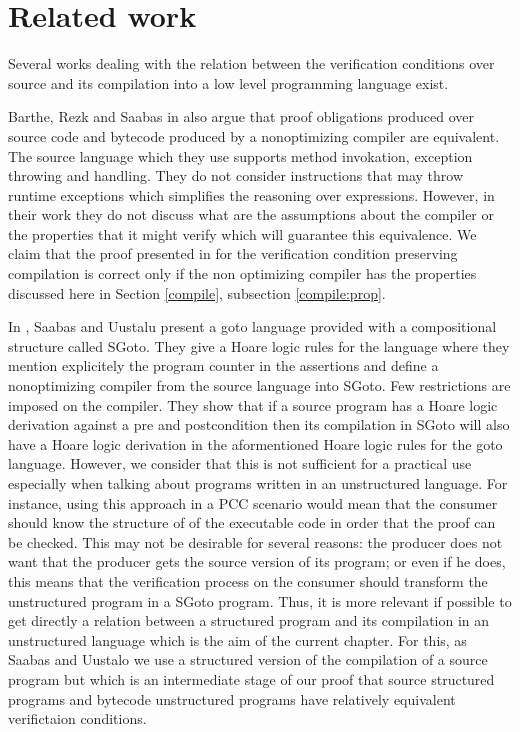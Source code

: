 \section{Related work}\label{pog:relWork}


Several works dealing with the relation between the 
verification conditions over source and its compilation into a low  level  programming  language exist.

Barthe, Rezk and Saabas in \cite{gta05:fast} also argue that proof obligations produced
over source code and
bytecode produced by a nonoptimizing compiler   are equivalent.
The source language which they use supports method invokation, exception throwing and handling. 
They do not consider instructions that may throw runtime exceptions which simplifies the reasoning over expressions. 
 However, in their work they do not discuss  what are the  assumptions about the compiler 
or the  properties that it might verify  which will guarantee this equivalence.
 We claim that the proof presented in \cite{gta05:fast} for
 the verification condition preserving compilation is correct only if the non optimizing 
 compiler has the properties discussed here in Section \ref{compile}, subsection \ref{compile:prop}.


In \cite{SU05CNS}, Saabas and Uustalu present a goto language provided with a compositional structure called SGoto.
They give a Hoare logic rules for the language where they mention explicitely the program counter in the assertions and define a nonoptimizing 
compiler from the source language into SGoto. Few  restrictions are imposed on the compiler. 
They show that if a source program has a Hoare logic derivation
 against a pre and postcondition then its compilation in SGoto will also have a Hoare
 logic derivation in the aformentioned Hoare logic rules for the goto language. However, we consider that this
 is not sufficient for a practical use especially when 
talking about programs written in an unstructured language. 
For instance, using this approach in a PCC scenario would mean that the consumer should know the structure of 
of the  executable code in order that the proof can be checked. This may not be desirable for several reasons:
the producer does not want  that the producer gets the source version of its program; 
or even if he does, this means that the verification process on the consumer should transform the unstructured program in a SGoto program.
 Thus, it is more relevant if possible to get directly  a relation between a structured program 
and its compilation in an  unstructured  language which is the aim of the current chapter.
 For this, as Saabas and Uustalo we use a  structured version of the compilation of a source program 
but which is an intermediate stage of our proof that source structured programs and bytecode unstructured 
programs have relatively equivalent verifictaion conditions.

